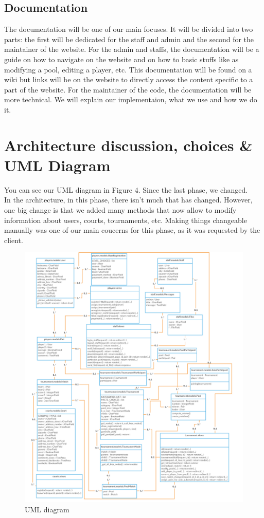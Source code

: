 \documentclass[a4paper, 12pt]{article}
\begin{document}
\subsection{Documentation}
The documentation will be one of our main focuses. It will be divided into two parts: the first will be dedicated for the staff and admin and the second for the maintainer of the website. For the admin and staffs, the documentation will be a guide on how to navigate on the website and on how to basic stuffs like as modifying a pool, editing a player, etc. This documentation will be found on a wiki but links will be on the website to directly access the content specific to a part of the website. For the maintainer of the code, the documentation will be more technical. We will explain our implementaion, what we use and how we do it. 



\newpage
\section{Architecture discussion, choices \& UML Diagram}

You can see our UML diagram in Figure 4. Since the last phase, we changed.\\

In the architecture, in this phase, there isn't much that has changed. However, one big change is that we added many methods that now allow to modify information about users, courts, tournaments, etc. Making things changeable manually was one of our main coucerns for this phase, as it was requested by the client.

\begin{figure}[b]
	\centering
 	\caption{\label{uml} UML diagram}
	\includegraphics[scale=0.2]{Class.png}
\end{figure}
\end{document}
